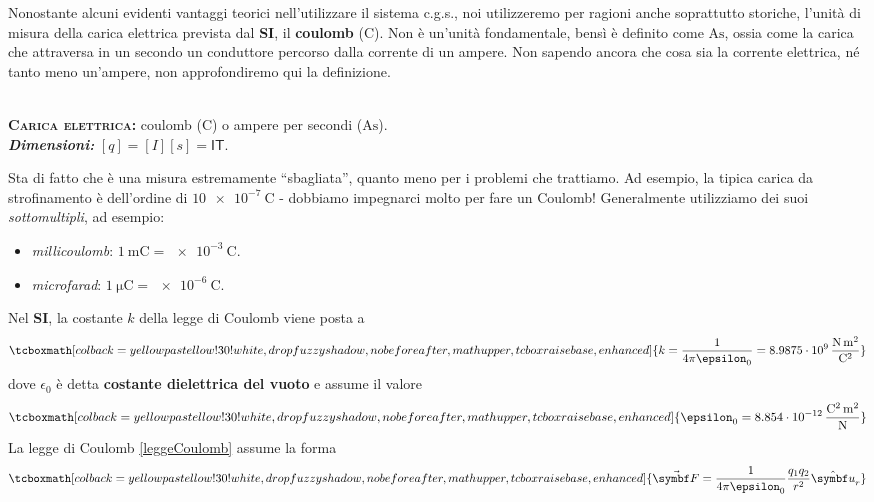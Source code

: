 Nonostante alcuni evidenti vantaggi teorici nell'utilizzare il sistema c.g.s., noi utilizzeremo per ragioni anche soprattutto storiche, l'unità di misura della carica elettrica prevista dal \textbf{SI}, il \textbf{coulomb} ($\unit{\coulomb}$). Non è un'unità fondamentale, bensì è definito come $\unit{\ampere\second}$, ossia come la carica che attraversa in un secondo un conduttore percorso dalla corrente di un ampere. Non sapendo ancora che cosa sia la corrente elettrica, né tanto meno un'ampere, non approfondiremo qui la definizione.
\begin{units}~\\
	\textbf{\textsc{Carica elettrica:}} coulomb  ($\unit{\coulomb}$) o ampere per secondi ($\unit{\ampere\second}$).\\
	\textit{\textbf{Dimensioni:}} $[q]=[I][s]=\mathsf{I}\mathsf{T}$.
\end{units}
Sta di fatto che è una misura estremamente ``sbagliata'', quanto meno per i problemi che trattiamo. Ad esempio, la tipica carica da strofinamento è dell'ordine di $\SI{10e-7}{\coulomb}$ - dobbiamo impegnarci molto per fare un Coulomb! Generalmente utilizziamo dei suoi \textit{sottomultipli}, ad esempio:
\begin{itemize}
	\item \textit{millicoulomb}: $\SI[per-mode = fraction,exponent-product=\ensuremath{\cdot}]{1}{\milli\coulomb}=\SI[per-mode = fraction,exponent-product=\ensuremath{\cdot}]{e-3}{\coulomb}$.
	\item \textit{microfarad}: $\SI[per-mode = fraction,exponent-product=\ensuremath{\cdot}]{1}{\micro\coulomb}=\SI[per-mode = fraction,exponent-product=\ensuremath{\cdot}]{e-6}{\coulomb}$.
\end{itemize}
Nel \textbf{SI}, la costante $k$ della legge di Coulomb viene posta a
\begin{equation}
	\tcboxmath[colback=yellowpastellow!30!white,drop fuzzy shadow, nobeforeafter, math upper, tcbox raise base, enhanced]{k=\frac{1}{4\pi\epsilon_0}=\SI[per-mode = fraction,exponent-product=\ensuremath{\cdot}]{8,9875e9}{\newton\square\metre\per\square\coulomb}}
\end{equation}
dove $\epsilon_0$ è detta \textbf{costante dielettrica del vuoto} e assume il valore
\begin{equation}
	\tcboxmath[colback=yellowpastellow!30!white,drop fuzzy shadow, nobeforeafter, math upper, tcbox raise base, enhanced]{\epsilon_0=\SI[per-mode = fraction,exponent-product=\ensuremath{\cdot}]{8,854e-12}{\square\coulomb\per\newton\square\metre}}
\end{equation}
La legge di Coulomb \ref{leggeCoulomb} assume la forma
\begin{equation}
	\tcboxmath[colback=yellowpastellow!30!white,drop fuzzy shadow, nobeforeafter, math upper, tcbox raise base, enhanced]{\vba{F}=\frac{1}{4\pi\epsilon_0}\frac{q_1q_2}{r^2}\vbh{u}_r}
\end{equation}
